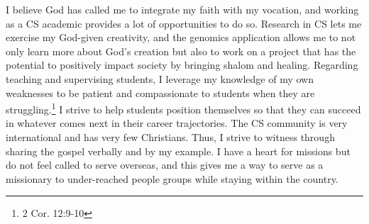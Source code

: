 \documentclass{article}
\begin{document}
I believe God has called me to integrate my faith with my vocation, and working as a CS academic provides a lot of opportunities to do so.
Research in CS lets me exercise my God-given creativity, and the genomics application allows me to not only learn more about God's creation but also to work on a project that has the potential to positively impact society by bringing shalom and healing.
Regarding teaching and supervising students, I leverage my knowledge of my own weaknesses to be patient and compassionate to students when they are struggling.\footnote{2 Cor. 12:9-10}
I strive to help students position themselves so that they can succeed in whatever comes next in their career trajectories.
The CS community is very international and has very few Christians.
Thus, I strive to witness through sharing the gospel verbally and by my example.
I have a heart for missions but do not feel called to serve overseas, and this gives me a way to serve as a missionary to under-reached people groups while staying within the country.
\end{document}
